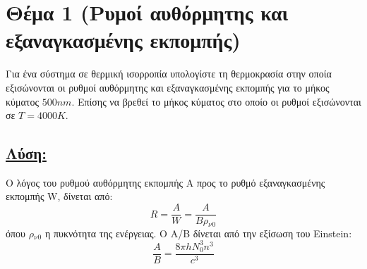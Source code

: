 \documentclass[a4paper,11pt,titlepage]{article}
\begin{document}






\newpage
\section{Θέμα 1 (Ρυμοί αυθόρμητης και εξαναγκασμένης εκπομπής)}
Για ένα σύστημα σε θερμική ισορροπία υπολογίστε τη θερμοκρασία στην οποία εξισώνονται οι ρυθμοί αυθόρμητης και εξαναγκασμένης εκπομπής για το μήκος κύματος $500nm$. Επίσης να βρεθεί το μήκος κύματος στο οποίο οι ρυθμοί εξισώνονται σε $T=4000K$.

\subsection*{\underline{Λύση:}}

Ο λόγος του ρυθμού αυθόρμητης εκπομπής Α προς το ρυθμό εξαναγκασμένης εκπομπής W, δίνεται από:
\begin{equation}
 R=\dfrac{A}{W}=\dfrac{A}{B\rho{_\nu{_0}}}
\end{equation}
όπου $\rho{_\nu{_0}}$ η πυκνότητα της ενέργειας. Ο A/B δίνεται από την εξίσωση του Einstein:
\begin{equation}
 \frac{A}{B}=\frac{8{\pi}hN_0^3n^3}{c^3}
\end{equation}
\end{document}

